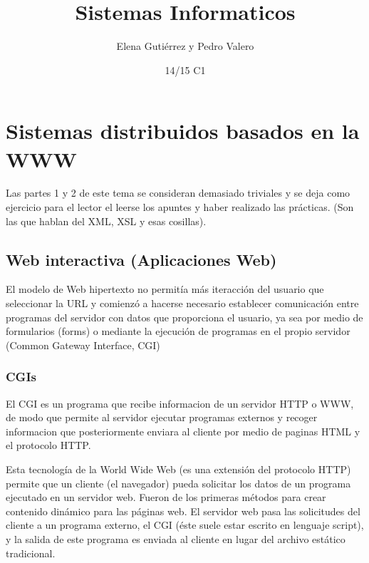 \documentclass{apuntes}
\title{Sistemas Informaticos}
\author{Elena Gutiérrez y Pedro Valero}
\date{14/15 C1}
\begin{document}
\pagestyle{plain}
\maketitle

\tableofcontents
\newpage
\setcounter{chapter}{1}
\chapter{Sistemas distribuidos basados en la WWW}

Las partes 1 y 2 de este tema se consideran demasiado triviales y se deja como ejercicio para el lector el leerse los apuntes y haber realizado las prácticas. (Son las que hablan del XML, XSL y esas cosillas).

\setcounter{section}{2}
\section{Web interactiva (Aplicaciones Web)}
El modelo de Web hipertexto no permitía más iteracción del usuario que seleccionar la URL y comienzó a hacerse necesario establecer comunicación entre programas del servidor con datos que proporciona el usuario, ya sea por medio de formularios (forms) o mediante la ejecución de programas en el propio servidor (Common Gateway Interface, CGI)

\subsection{CGIs}
\begin{defn}[CGI]
El CGI es un programa que recibe informacion de un servidor HTTP o WWW, de modo que permite al servidor ejecutar programas externos y recoger informacion que posteriormente enviara al cliente por medio de paginas HTML y el protocolo HTTP. 
\end{defn}

Esta tecnología de la World Wide Web (es una extensión del protocolo HTTP) permite que un cliente (el navegador) pueda solicitar los datos de un programa ejecutado en un servidor web. Fueron de los primeras métodos para crear contenido dinámico para las páginas web. El servidor web pasa las solicitudes del cliente a un programa externo, el CGI  (éste suele estar escrito en lenguaje script), y la salida de este programa es enviada al cliente en lugar del archivo estático tradicional.
\end{document}
